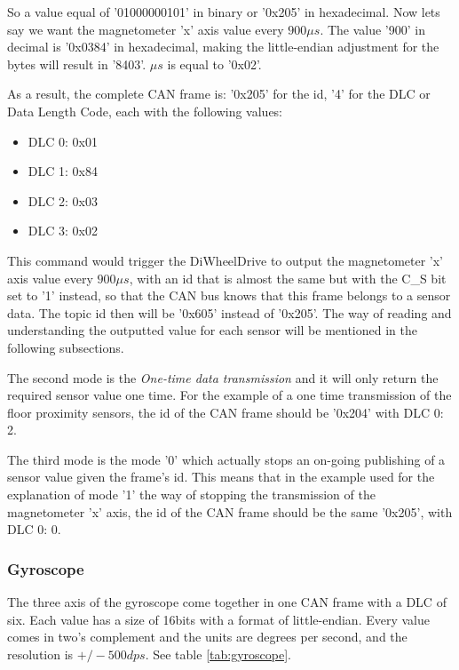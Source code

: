 \documentclass[12pt]{report}%
\begin{document}
So a value equal of '01000000101' in binary or '0x205' in hexadecimal. Now lets say we want the magnetometer 'x' axis value every $900\mu s$. The value '900' in decimal is '0x0384' in hexadecimal, making the little-endian adjustment for the bytes will result in '8403'. $\mu s$ is equal to '0x02'.

As a result, the complete CAN frame is: '0x205' for the id, '4' for the DLC or Data Length Code, each with the following values:

\begin{itemize}
	\item DLC 0: 0x01
	\item DLC 1: 0x84
	\item DLC 2: 0x03
	\item DLC 3: 0x02
\end{itemize}

This command would trigger the DiWheelDrive to output the magnetometer 'x' axis value every $900\mu s$, with an id that is almost the same but with the C\_S bit set to '1' instead, so that the CAN bus knows that this frame belongs to a sensor data. The topic id then will be '0x605' instead of '0x205'. The way of reading and understanding the outputted value for each sensor will be mentioned in the following subsections.

The second mode is the \textit{One-time data transmission} and it will only return the required sensor value one time. For the example of a one time transmission of the floor proximity sensors, the id of the CAN frame should be '0x204' with DLC 0: 2.

The third mode is the mode '0' which actually stops an on-going publishing of a sensor value given the frame's id. This means that in the example used for the explanation of mode '1' the way of stopping the transmission of the magnetometer 'x' axis, the id of the CAN frame should be the same '0x205', with DLC 0: 0.

\subsubsection{Gyroscope}
The three axis of the gyroscope come together in one CAN frame with a DLC of six. Each value has a size of 16bits with a format  of little-endian. Every value comes in two's complement and the units are degrees per second, and the resolution is $+/-500 dps$. See table \ref{tab:gyroscope}.
\end{document}
